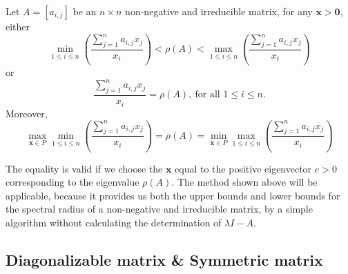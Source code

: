 \begin{thm}
Let $A=\left[a_{i,j}\right]$ be an $n\times n$ non-negative and
irreducible matrix, for any $\mathbf{x}>\mathbf{0}$, either
\begin{equation}
\min_{1\leq i\leq n}\left(\frac{\sum_{j=1}^{n}a_{i,j}x_{j}}{x_{i}}\right)<\rho\left(A\right)<\max_{1\leq i\leq n}\left(\frac{\sum_{j=1}^{n}a_{i,j}x_{j}}{x_{i}}\right)
\end{equation}
or 
\begin{equation}
\frac{\sum_{j=1}^{n}a_{i,j}x_{j}}{x_{i}}=\rho\left(A\right),\ \mbox{for all }1\leq i\leq n.
\end{equation}
Moreover,
\begin{equation}
\max_{\mathbf{x}\in P}\min_{1\leq i\leq n}\left(\frac{\sum_{j=1}^{n}a_{i,j}x_{j}}{x_{i}}\right)=\rho\left(A\right)=\min_{\mathbf{x}\in P}\max_{1\leq i\leq n}\left(\frac{\sum_{j=1}^{n}a_{i,j}x_{j}}{x_{i}}\right)
\end{equation}

\end{thm}
The equality is valid if we choose the $\mathbf{x}$ equal to the
positive eigenvector $e>0$ corresponding to the eigenvalue $\rho\left(A\right)$.
The method shown above will be applicable, because it provides us
both the upper bounds and lower bounds for the spectral radius of
a non-negative and irreducible matrix, by a simple algorithm without
calculating the determination of $\lambda I-A$. 




\subsection{Diagonalizable matrix \& Symmetric matrix}

